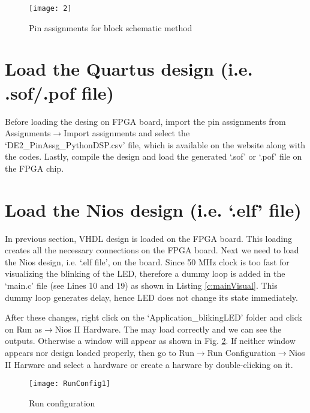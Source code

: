 \begin{figure}
	\centering
	\texttt{[image: 2]}
	\caption{Pin assignments for block schematic method }
	\label{fig:qsysBdfPinAssg}
\end{figure}



\section{Load the Quartus design (i.e. .sof/.pof file)}\label{sec:AddLoadVHDL}
Before loading the desing on FPGA board, import the pin assignments from Assignments$\rightarrow$Import assignments and select the `DE2\_PinAssg\_PythonDSP.csv' file, which is available on the website along with the codes. Lastly, compile the design and load the generated `.sof' or `.pof' file on the FPGA chip.  




\section{Load the Nios design (i.e. `.elf' file)}\label{sec:AddLoadNIOS}
In previous section, VHDL design is loaded on the FPGA board. This loading creates all the necessary connections on the FPGA board. Next we need to load the Nios design, i.e. `.elf file', on the board. Since 50 MHz clock is too fast for visualizing the blinking of the LED, therefore a dummy loop is added in the `main.c' file (see Lines 10 and 19) as shown in Listing \ref{c:mainVisual}. This dummy loop generates delay, hence LED does not change its state immediately. 



After these changes, right click on the `Application\_blikingLED' folder and click on Run as$\rightarrow$Nios II Hardware. The may load correctly and we can see the outputs. Otherwise a window will appear as shown in Fig. \ref{fig:1run}. If neither window appears nor design loaded properly, then go to Run$\rightarrow$Run Configuration$\rightarrow$Nios II Harware and select a hardware or create a harware by double-clicking on it. 

\begin{figure}[!h]
	\centering
	\texttt{[image: RunConfig1]}
	\caption{Run configuration}
	\label{fig:1run}
\end{figure}


